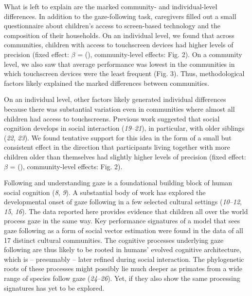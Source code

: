 \documentclass[
  man,floatsintext]{apa6}
\begin{document}
What is left to explain are the marked community- and individual-level differences. In addition to the gaze-following task, caregivers filled out a small questionnaire about children's access to screen-based technology and the composition of their households. On an individual level, we found that across communities, children with access to touchscreen devices had higher levels of precision (fixed effect: \(\beta\) = (), community-level effects: Fig. 2). On a community level, we also saw that average performance was lowest in the communities in which touchscreen devices were the least frequent (Fig. 3). Thus, methodological factors likely explained the marked differences between communities.

On an individual level, other factors likely generated individual differences because there was substantial variation even in communities where almost all children had access to touchscreens. Previous work suggested that social cognition develops in social interaction (\emph{19}--\emph{21}), in particular, with older siblings (\emph{22}, \emph{23}). We found tentative support for this idea in the form of a small but consistent effect in the direction that participants living together with more children older than themselves had slightly higher levels of precision (fixed effect: \(\beta\) = (), community-level effects: Fig. 2).

Following and understanding gaze is a foundational building block of human social cognition (\emph{8}, \emph{9}). A substantial body of work has explored the developmental onset of gaze following in a few selected cultural settings (\emph{10}--\emph{12}, \emph{15}, \emph{16}). The data reported here provides evidence that children all over the world process gaze in the same way. Key performance signatures of a model that sees gaze following as a form of social vector estimation were found in the data of all 17 distinct cultural communities. The cognitive processes underlying gaze following are thus likely to be rooted in humans' evolved cognitive architecture, which is -- presumably -- later refined during social interaction. The phylogenetic roots of these processes might possibly lie much deeper as primates from a wide range of species follow gaze (\emph{24}--\emph{26}). Yet, if they also show the same processing signatures has yet to be explored.
\end{document}
